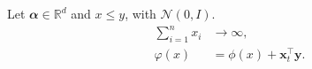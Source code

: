 \documentclass{article}
\begin{document}
Let $𝜶 ∈ ℝ^d$ and $x ≤ y$, with $𝒩(0, I)$.
\begin{align}
  ∑_{i=1}^{n} x_i &→ ∞, \\
  φ(x) &= ϕ(x) + 𝐱_t^{⊤} 𝐲.
\end{align}
\end{document}
